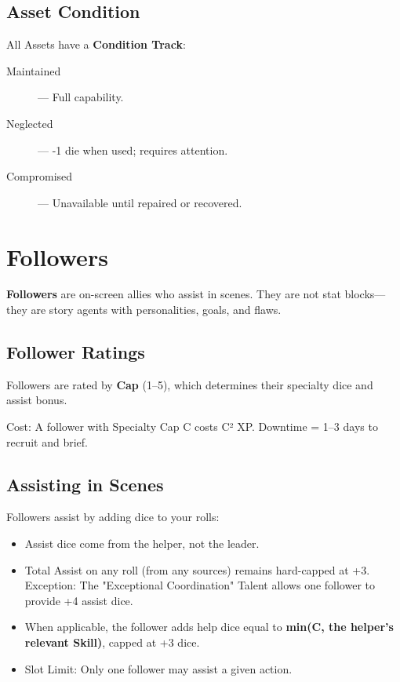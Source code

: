 \subsection*{Asset Condition}

All Assets have a \textbf{Condition Track}:

\begin{description}
  \item[Maintained] — Full capability.
  \item[Neglected] — -1 die when used; requires attention.
  \item[Compromised] — Unavailable until repaired or recovered.
\end{description}

\section{Followers}

\textbf{Followers} are on-screen allies who assist in scenes. They are not stat blocks—they are story agents with personalities, goals, and flaws.

\subsection*{Follower Ratings}

Followers are rated by \textbf{Cap} (1–5), which determines their specialty dice and assist bonus.

Cost: A follower with Specialty Cap C costs C² XP. Downtime = 1–3 days to recruit and brief.

\subsection*{Assisting in Scenes}

Followers assist by adding dice to your rolls:

\begin{itemize}
  \item Assist dice come from the helper, not the leader.
  \item Total Assist on any roll (from any sources) remains hard-capped at +3. Exception: The "Exceptional Coordination"  Talent allows one follower to provide +4 assist dice.
  \item When applicable, the follower adds help dice equal to \textbf{min(C, the helper's relevant Skill)}, capped at +3 dice.
  \item Slot Limit: Only one follower may assist a given action.
\end{itemize}

